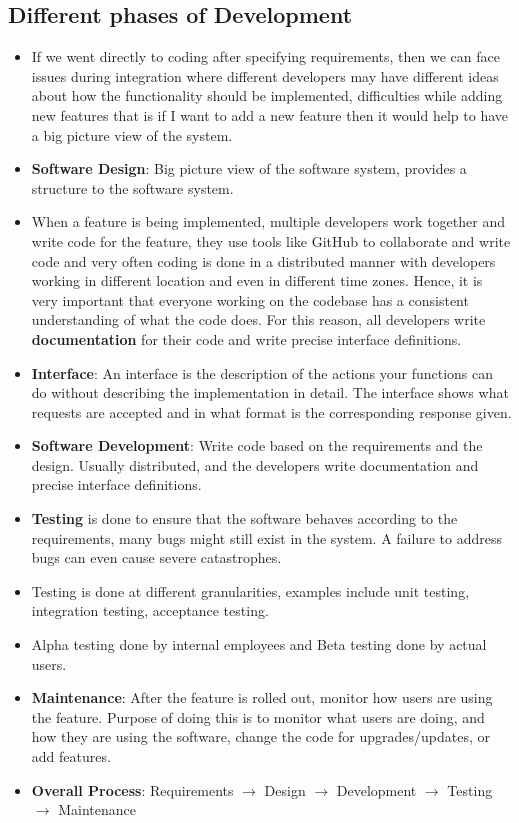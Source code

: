 \documentclass[a4paper]{article}
\begin{document}
\subsection{Different phases of Development}
\begin{itemize}
    \item If we went directly to coding after specifying requirements, then we can face issues during integration where different developers may have different ideas about how the functionality should be implemented, difficulties while adding new features that is if I want to add a new feature then it would help to have a big picture view of the system.
    \item \textbf{Software Design}: Big picture view of the software system, provides a structure to the software system.
    \item When a feature is being implemented, multiple developers work together and write code for the feature, they use tools like GitHub to collaborate and write code and very often coding is done in a distributed manner with developers working in different location and even in different time zones. Hence, it is very important that everyone working on the codebase has a consistent understanding of what the code does. For this reason, all developers write \textbf{documentation} for their code and write precise interface definitions.
    \item \textbf{Interface}: An interface is the description of the actions your functions can do without describing the implementation in detail. The interface shows what requests are accepted and in what format is the corresponding response given.
    \item \textbf{Software Development}: Write code based on the requirements and the design. Usually distributed, and the developers write documentation and precise interface definitions.
    \item \textbf{Testing} is done to ensure that the software behaves according to the requirements, many bugs might still exist in the system. A failure to address bugs can even cause severe catastrophes.
    \item Testing is done at different granularities, examples include unit testing, integration testing, acceptance testing.
    \item Alpha testing done by internal employees and Beta testing done by actual users.
    \item \textbf{Maintenance}: After the feature is rolled out, monitor how users are using the feature. Purpose of doing this is to monitor what users are doing, and how they are using the software, change the code for upgrades/updates, or add features.
    \item \textbf{Overall Process}: Requirements $\rightarrow$ Design $\rightarrow$ Development $\rightarrow$ Testing $\rightarrow$ Maintenance
\end{itemize}
\end{document}
